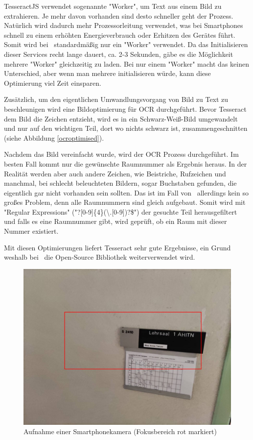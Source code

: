 
TesseractJS verwendet sogenannte "Worker", um Text aus einem Bild zu extrahieren. Je mehr davon vorhanden sind desto schneller geht der Prozess. Natürlich wird dadurch mehr Prozessorleitung verwendet, was bei Smartphones schnell zu einem erhöhten Energieverbrauch oder Erhitzen des Gerätes führt. Somit wird bei \ZELIA\ standardmäßig nur ein "Worker" verwendet. Da das Initialisieren dieser Services recht lange dauert, ca. 2-3 Sekunden, gäbe es die Möglichkeit mehrere "Worker" gleichzeitig zu laden. Bei nur einem "Worker" macht das keinen Unterschied, aber wenn man mehrere initialisieren würde, kann diese Optimierung viel Zeit einsparen.

Zusätzlich, um den eigentlichen Umwandlungsvorgang von Bild zu Text zu beschleunigen wird eine Bildoptimierung für OCR durchgeführt. Bevor Tesseract dem Bild die Zeichen entzieht, wird es in ein Schwarz-Weiß-Bild umgewandelt und nur auf den wichtigen Teil, dort wo nichts schwarz ist, zusammengeschnitten (siehe Abbildung \ref{ocroptimised}).

Nachdem das Bild vereinfacht wurde, wird der OCR Prozess durchgeführt. Im besten Fall kommt nur die gewünschte Raumnummer als Ergebnis heraus. In der Realität werden aber auch andere Zeichen, wie Beistriche, Rufzeichen und manchmal, bei schlecht beleuchteten Bildern, sogar Buchstaben gefunden, die eigentlich gar nicht vorhanden sein sollten. Das ist im Fall von \ZELIA\ allerdings kein so großes Problem, denn alle Raumnummern sind gleich aufgebaut. Somit wird mit "Regular Expressions" ("{\ttfamily [A-Z]?[0-9]\{4\}(\textbackslash.[0-9])?\$}") der gesuchte Teil herausgefiltert und falls es eine Raumnummer gibt, wird geprüft, ob ein Raum mit dieser Nummer existiert.

Mit diesen Optimierungen liefert Tesseract sehr gute Ergebnisse, ein Grund weshalb bei \ZELIA\ die Open-Source Bibliothek weiterverwendet wird.


\begin{figure}
    \centering
    \includegraphics[width=120mm]{media/OCR/original}
    \caption{Aufnahme einer Smartphonekamera (Fokusbereich rot markiert)}
    \label{fig:phonecam}
\end{figure}



